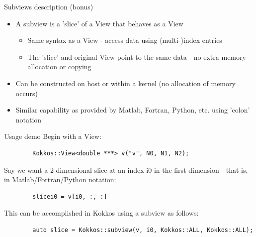 \documentclass[
    aspectratio=169,
]{beamer}
\begin{document}
\begin{frame}{Subviews description (bonus)}
    \begin{itemize}
        \item A subview is a ’slice’ of a View that behaves as a View
        \pause
        \begin{itemize}
            \item Same syntax as a View - access data using (multi-)index entries
            \pause
            \item The ’slice’ and original View point to the same data - no extra
            memory allocation or copying
        \end{itemize}
        \pause
        \item Can be constructed on host or within a kernel (no allocation
        of memory occurs)
        \pause
        \item Similar capability as provided by Matlab, Fortran, Python, etc.
        using ’colon’ notation
    \end{itemize}
\end{frame}

\begin{frame}[fragile]{Usage demo}
    Begin with a View:
    \begin{verbatim}
        Kokkos::View<double ***> v("v", N0, N1, N2);
    \end{verbatim}
    \pause
    Say we want a 2-dimensional slice at an index i0 in the first
    dimension - that is, in Matlab/Fortran/Python notation:
    \begin{verbatim}
        slicei0 = v[i0, :, :]
    \end{verbatim}
    \pause
    This can be accomplished in Kokkos using a subview as follows:
    \begin{verbatim}
        auto slice = Kokkos::subview(v, i0, Kokkos::ALL, Kokkos::ALL);
    \end{verbatim}
\end{frame}
\end{document}
